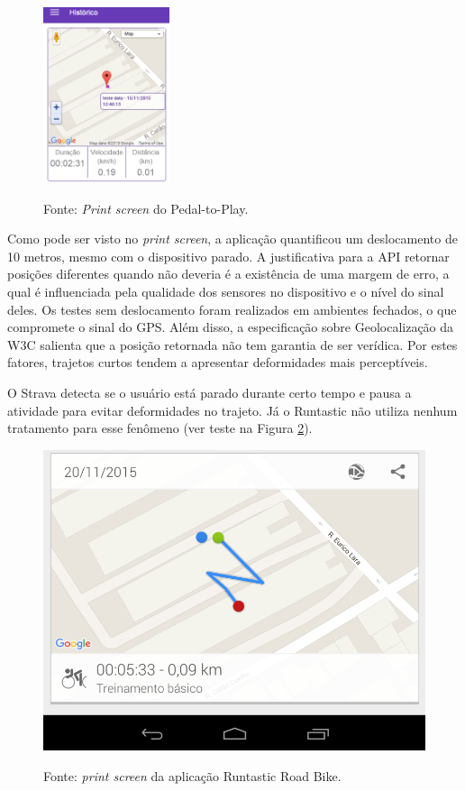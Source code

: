 \begin{figure}[h]
\begin{minipage}{1.0\textwidth}
    \centerline{\includegraphics[width=10em]{figuras/p2pTrackParado.png}}
    \label{fig:trackParado}
\end{minipage}
\centerline{Fonte: \textit{Print screen} do Pedal-to-Play.}
\end{figure}

Como pode ser visto no \textit{print screen}, a aplicação quantificou um deslocamento de 10 metros, mesmo com o dispositivo parado. A justificativa para a API retornar posições diferentes quando não deveria é a existência de uma margem de erro, a qual é influenciada pela qualidade dos sensores no dispositivo e o nível do sinal deles. Os testes sem deslocamento foram realizados em ambientes fechados, o que compromete o sinal do GPS. Além disso, a especificação sobre Geolocalização da W3C\citeyearpar{w3cGeo} salienta que a posição retornada não tem garantia de ser verídica. Por estes fatores, trajetos curtos tendem a apresentar deformidades mais perceptíveis.
\par
O Strava detecta se o usuário está parado durante certo tempo e pausa a atividade para evitar deformidades no trajeto. Já o Runtastic não utiliza nenhum tratamento para esse fenômeno (ver teste na Figura \ref{fig:runtasticTesteParado}). 

\begin{figure}[hb]
\begin{minipage}{1.0\textwidth}
  \centerline{\includegraphics[width=.3\linewidth]{figuras/runtasticTesteParado.png}}
  \label{fig:runtasticTesteParado}
\end{minipage}
\par%
\bigskip
\centerline{Fonte: \textit{print screen} da aplicação Runtastic Road Bike.}
\end{figure}